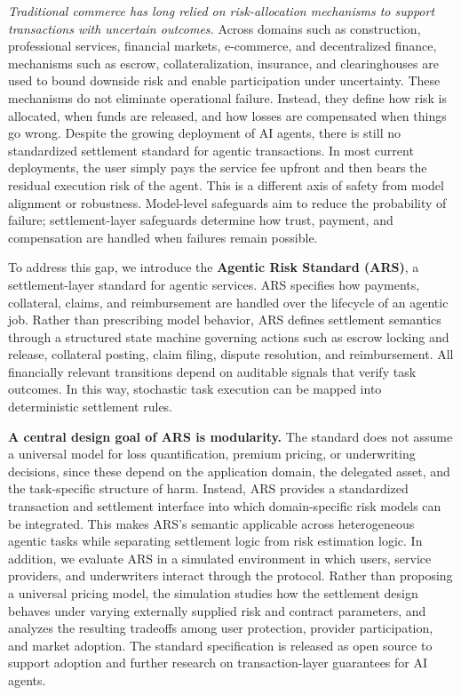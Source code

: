 \documentclass{article} %
\begin{document}
\textit{Traditional commerce has long relied on risk-allocation mechanisms to support transactions with uncertain outcomes.} Across domains such as construction, professional services, financial markets, e-commerce, and decentralized finance, mechanisms such as escrow, collateralization, insurance, and clearinghouses are used to bound downside risk and enable participation under uncertainty. These mechanisms do not eliminate operational failure. Instead, they define how risk is allocated, when funds are released, and how losses are compensated when things go wrong. Despite the growing deployment of AI agents, there is still no standardized settlement standard for agentic transactions. In most current deployments, the user simply pays the service fee upfront and then bears the residual execution risk of the agent. This is a different axis of safety from model alignment or robustness. Model-level safeguards aim to reduce the probability of failure; settlement-layer safeguards determine how trust, payment, and compensation are handled when failures remain possible. 



To address this gap, we introduce the \textbf{Agentic Risk Standard (\textsc{ARS})}, a settlement-layer standard for agentic services. \textsc{ARS} specifies how payments, collateral, claims, and reimbursement are handled over the lifecycle of an agentic job. Rather than prescribing model behavior, \textsc{ARS} defines settlement semantics through a structured state machine governing actions such as escrow locking and release, collateral posting, claim filing, dispute resolution, and reimbursement. All financially relevant transitions depend on auditable signals that verify task outcomes. In this way, stochastic task execution can be mapped into deterministic settlement rules.

\textbf{A central design goal of \textsc{ARS} is modularity.} The standard does not assume a universal model for loss quantification, premium pricing, or underwriting decisions, since these depend on the application domain, the delegated asset, and the task-specific structure of harm. Instead, \textsc{ARS} provides a standardized transaction and settlement interface into which domain-specific risk models can be integrated. This makes \textsc{ARS}'s semantic applicable across heterogeneous agentic tasks while separating settlement logic from risk estimation logic. In addition, we evaluate \textsc{ARS} in a simulated environment in which users, service providers, and underwriters interact through the protocol. Rather than proposing a universal pricing model, the simulation studies how the settlement design behaves under varying externally supplied risk and contract parameters, and analyzes the resulting tradeoffs among user protection, provider participation, and market adoption. The standard specification is released as open source to support adoption and further research on transaction-layer guarantees for AI agents.
\end{document}
